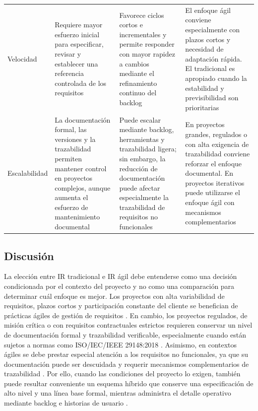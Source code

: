 \documentclass[journal,onecolumn]{IEEEtran}
\begin{document}
\begin{longtable}{@{}p{2.1cm} p{3.5cm} p{3.5cm} p{3.5cm}@{}}
		Velocidad & Requiere mayor esfuerzo inicial para especificar, revisar y establecer una referencia controlada de los requisitos \cite{ISO29148-2018} & Favorece ciclos cortos e incrementales y permite responder con mayor rapidez a cambios mediante el refinamiento continuo del backlog \cite{Tomaselli2025} & El enfoque ágil conviene especialmente con plazos cortos y necesidad de adaptación rápida. El tradicional es apropiado cuando la estabilidad y previsibilidad son prioritarias \\
		Escalabilidad & La documentación formal, las versiones y la trazabilidad permiten mantener control en proyectos complejos, aunque aumenta el esfuerzo de mantenimiento documental \cite{ISO29148-2018} & Puede escalar mediante backlog, herramientas y trazabilidad ligera; sin embargo, la reducción de documentación puede afectar especialmente la trazabilidad de requisitos no funcionales \cite{LohMunKeong2022} & En proyectos grandes, regulados o con alta exigencia de trazabilidad conviene reforzar el enfoque documental. En proyectos iterativos puede utilizarse el enfoque ágil con mecanismos complementarios \\
		\bottomrule
	\end{longtable}
	
	\subsection*{Discusión}
	
	La elección entre IR tradicional e IR ágil debe entenderse como una decisión condicionada por el contexto del proyecto y no como una comparación para determinar cuál enfoque es mejor. Los proyectos con alta variabilidad de requisitos, plazos cortos y participación constante del cliente se benefician de prácticas ágiles de gestión de requisitos \cite{Tomaselli2025}. En cambio, los proyectos regulados, de misión crítica o con requisitos contractuales estrictos requieren conservar un nivel de documentación formal y trazabilidad verificable, especialmente cuando están sujetos a normas como ISO/IEC/IEEE 29148:2018 \cite{Tomaselli2025, ISO29148-2018}. Asimismo, en contextos ágiles se debe prestar especial atención a los requisitos no funcionales, ya que su documentación puede ser descuidada y requerir mecanismos complementarios de trazabilidad \cite{LohMunKeong2022}. Por ello, cuando las condiciones del proyecto lo exigen, también puede resultar conveniente un esquema híbrido que conserve una especificación de alto nivel y una línea base formal, mientras administra el detalle operativo mediante backlog e historias de usuario \cite{Tomaselli2025}.
	\newpage
\end{document}
